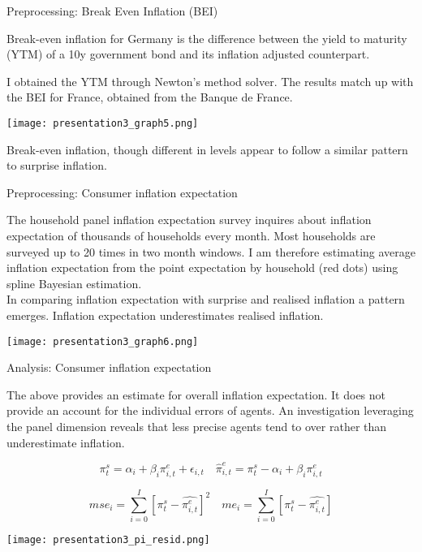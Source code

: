 \documentclass[9pt]{beamer}
\begin{document}
	
	\begin{frame}{Preprocessing: Break Even Inflation (BEI)}
		
		Break-even inflation for Germany is the difference between the yield to maturity (YTM) of a 10y government bond and its inflation adjusted counterpart.
		
		I obtained the YTM through Newton's method solver. The results match up with the BEI for France, obtained from the Banque de France.
		
		\begin{center}
			\texttt{[image: presentation3\_graph5.png]}
		\end{center}
		
		Break-even inflation, though different in levels appear to follow a similar pattern to surprise inflation.
		
	\end{frame}

	\begin{frame}{Preprocessing: Consumer inflation expectation}
		
		The household panel inflation expectation survey inquires about inflation expectation of thousands of households every month. Most households are surveyed up to 20 times in two month windows. 
		I am therefore estimating average inflation expectation from the point expectation by household (red dots) using spline Bayesian estimation. \\
				
		In comparing inflation expectation with surprise and realised inflation a pattern emerges. Inflation expectation underestimates realised inflation. 
		
		\begin{center}
			\texttt{[image: presentation3\_graph6.png]}
		\end{center}
	
	\end{frame}

	\begin{frame}{Analysis: Consumer inflation expectation}
		
	The above provides an estimate for overall inflation expectation. It does not provide an account for the individual errors of agents.
	An investigation leveraging the panel dimension reveals that less precise agents tend to over rather than underestimate inflation.
	
		\[
			\pi^s_t = \alpha_i + \beta_i \pi^e_{i,t} + \epsilon_{i,t} \quad \hat{\pi}_{i,t}^e = \pi^s_t - \alpha_i + \beta_i \pi^e_{i,t}
		\]
		
		\[
			mse_i = \sum_{i=0}^{I} \left[\pi^s_t - \hat{\pi^e_{i,t}} \right]^2
			\quad
			me_i =  \sum_{i=0}^{I} \left[\pi^s_t - \hat{\pi^e_{i,t}} \right]
		\]
		
		\begin{center}
			\texttt{[image: presentation3\_pi\_resid.png]}
		\end{center}
	\end{frame}

	

	

	
\end{document}
